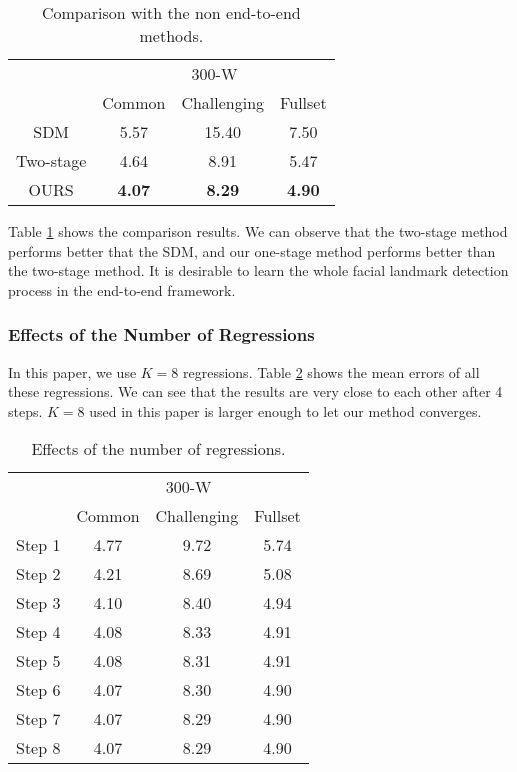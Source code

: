 \documentclass[journal]{IEEEtran}
\begin{document}
\begin{table}[h]
\small
    \centering \caption{Comparison with the non end-to-end methods.}
    \begin{tabular}{c|c c c}
      \hline
 & \multicolumn{3}{|c}{300-W}\\
    & Common & Challenging & Fullset \\
        \hline
         SDM  & 5.57 & 15.40 & 7.50  \\
         \hline
        Two-stage & 4.64 & 8.91 & 5.47 \\
        \hline
        OURS & \textbf{4.07} & \textbf{8.29} & \textbf{4.90} \\
        \hline
        \end{tabular}
    \label{two-stage}
\end{table}

Table \ref{two-stage} shows the comparison results. We can observe that the two-stage method performs better that the SDM, and our one-stage method performs better than the two-stage method. It is desirable to learn the whole facial landmark detection process in the end-to-end framework.



\subsubsection{Effects of the Number of Regressions}
In this paper, we use $K=8$ regressions. Table \ref{steps} shows the mean errors of all these regressions. We can see that the results are very close to each other after 4 steps. $K = 8$ used in this paper is larger enough to let our method converges.
\begin{table}[h]
\small
    \centering \caption{Effects of the number of regressions.}
    \begin{tabular}{c|c c c}
      \hline
 & \multicolumn{3}{|c}{300-W}\\
    & Common & Challenging & Fullset \\
        \hline
         Step 1 &  4.77 & 9.72 & 5.74 \\
         \hline
        Step 2 &  4.21 & 8.69 & 5.08 \\
           \hline
         Step 3 & 4.10 & 8.40 & 4.94  \\
         \hline
        Step 4 &  4.08 & 8.33 & 4.91 \\
           \hline
         Step 5 &  4.08 & 8.31 & 4.91  \\
         \hline
        Step 6 &  4.07 & 8.30 & 4.90 \\
           \hline
         Step 7 &  4.07 & 8.29 & 4.90  \\
         \hline
        Step 8 &  4.07 & 8.29 & 4.90 \\
           \hline
        \end{tabular}
    \label{steps}
\end{table}
\end{document}
